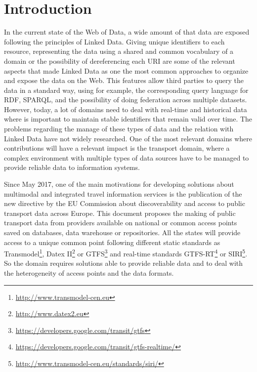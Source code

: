\documentclass[sw]{iosart2x}
\begin{document}
\section{Introduction}\label{introduction} %
In the current state of the Web of Data, a wide amount of that data are exposed following the principles of Linked Data\cite{bizer2009linked}. Giving unique identifiers to each resource, representing the data using a shared and common vocabulary of a domain or the possibility of dereferencing each URI are some of the relevant aspects that made Linked Data as one the most common approaches to organize and expose the data on the Web\cite{heath2011linked}. This features allow third parties to query the data in a standard way, using for example, the corresponding query language for RDF, SPARQL\cite{prud2006sparql}, and the possibility of doing federation across multiple datasets\cite{buil2013federating}. However, today, a lot of domains need to deal with real-time and historical data where is important to maintain stable identifiers that remain valid over time. The problems regarding the manage of these types of data and the relation with Linked Data have not widely researched. One of the most relevant domains where contributions will have a relevant impact is the transport domain, where a complex environment with multiple types of data sources have to be managed to provide reliable data to information systems.

Since May 2017, one of the main motivations for developing solutions about multimodal and integrated travel information services is the publication of the new directive by the EU Commission about discoverability and access to public transport data across Europe. This document proposes the making of public transport data from providers available on national or common access points saved on databases, data warehouse or repositories. All the states will provide access to a unique common point following different static standards as Transmodel\footnote{\url{http://www.transmodel-cen.eu}}, Datex II\footnote{\url{http://www.datex2.eu}} or GTFS\footnote{\url{https://developers.google.com/transit/gtfs}} and real-time standards GTFS-RT\footnote{\url{https://developers.google.com/transit/gtfs-realtime/}} or SIRI\footnote{\url{http://www.transmodel-cen.eu/standards/siri/}}. So the domain requires solutions able to provide reliable data and to deal with the heterogeneity of access points and the data formats.
\end{document}
